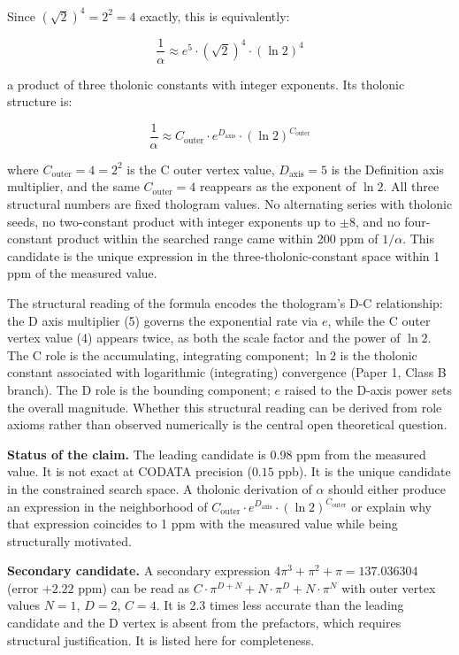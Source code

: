 \documentclass[
  11pt,
  letterpaper,
]{article}
\begin{document}
Since \((\sqrt{2})^4 = 2^2 = 4\) exactly, this is equivalently:

\[\frac{1}{\alpha} \approx e^5 \cdot (\sqrt{2})^4 \cdot (\ln 2)^4\]

a product of three tholonic constants with integer exponents. Its
tholonic structure is:

\[\frac{1}{\alpha} \approx C_{\text{outer}} \cdot e^{D_{\text{axis}}} \cdot (\ln 2)^{C_{\text{outer}}}\]

where \(C_{\text{outer}} = 4 = 2^2\) is the C outer vertex value,
\(D_{\text{axis}} = 5\) is the Definition axis multiplier, and the same
\(C_{\text{outer}} = 4\) reappears as the exponent of \(\ln 2\). All
three structural numbers are fixed thologram values. No alternating
series with tholonic seeds, no two-constant product with integer
exponents up to \(\pm 8\), and no four-constant product within the
searched range came within 200 ppm of \(1/\alpha\). This candidate is
the unique expression in the three-tholonic-constant space within 1 ppm
of the measured value.

The structural reading of the formula encodes the thologram's D-C
relationship: the D axis multiplier (5) governs the exponential rate via
\(e\), while the C outer vertex value (4) appears twice, as both the
scale factor and the power of \(\ln 2\). The C role is the accumulating,
integrating component; \(\ln 2\) is the tholonic constant associated
with logarithmic (integrating) convergence (Paper 1, Class B branch).
The D role is the bounding component; \(e\) raised to the D-axis power
sets the overall magnitude. Whether this structural reading can be
derived from role axioms rather than observed numerically is the central
open theoretical question.

\textbf{Status of the claim.} The leading candidate is 0.98 ppm from the
measured value. It is not exact at CODATA precision (\(0.15\) ppb). It
is the unique candidate in the constrained search space. A tholonic
derivation of \(\alpha\) should either produce an expression in the
neighborhood of
\(C_{\text{outer}} \cdot e^{D_{\text{axis}}} \cdot (\ln 2)^{C_{\text{outer}}}\)
or explain why that expression coincides to 1 ppm with the measured
value while being structurally motivated.

\textbf{Secondary candidate.} A secondary expression
\(4\pi^3 + \pi^2 + \pi = 137.036304\) (error \(+2.22\) ppm) can be read
as \(C \cdot \pi^{D+N} + N \cdot \pi^D + N \cdot \pi^N\) with outer
vertex values \(N = 1\), \(D = 2\), \(C = 4\). It is 2.3 times less
accurate than the leading candidate and the D vertex is absent from the
prefactors, which requires structural justification. It is listed here
for completeness.
\end{document}
